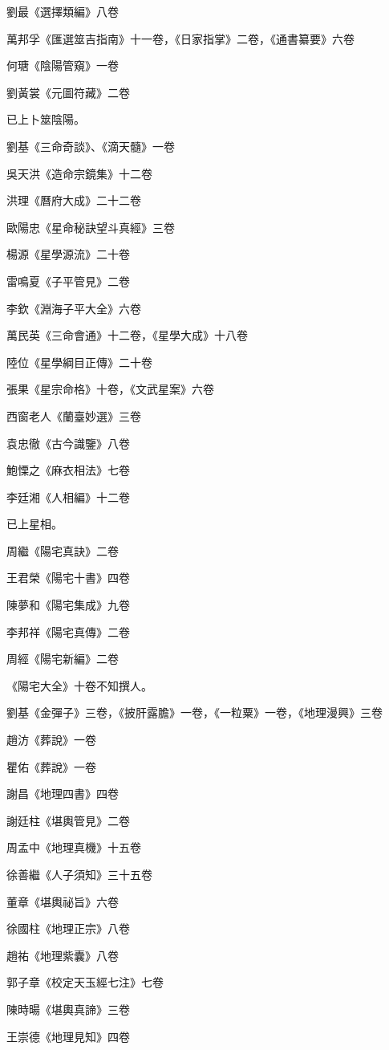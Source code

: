 劉最《選擇類編》八卷

萬邦孚《匯選筮吉指南》十一卷，《日家指掌》二卷，《通書纂要》六卷

何瑭《陰陽管窺》一卷

劉黃裳《元圖符藏》二卷

已上卜筮陰陽。

劉基《三命奇談》、《滴天髓》一卷

吳天洪《造命宗鏡集》十二卷

洪理《曆府大成》二十二卷

歐陽忠《星命秘訣望斗真經》三卷

楊源《星學源流》二十卷

雷鳴夏《子平管見》二卷

李欽《淵海子平大全》六卷

萬民英《三命會通》十二卷，《星學大成》十八卷

陸位《星學綱目正傳》二十卷

張果《星宗命格》十卷，《文武星案》六卷

西窗老人《蘭臺妙選》三卷

袁忠徹《古今識鑒》八卷

鮑慄之《麻衣相法》七卷

李廷湘《人相編》十二卷

已上星相。

周繼《陽宅真訣》二卷

王君榮《陽宅十書》四卷

陳夢和《陽宅集成》九卷

李邦祥《陽宅真傳》二卷

周經《陽宅新編》二卷

《陽宅大全》十卷不知撰人。

劉基《金彈子》三卷，《披肝露膽》一卷，《一粒粟》一卷，《地理漫興》三卷

趙汸《葬說》一卷

瞿佑《葬說》一卷

謝昌《地理四書》四卷

謝廷柱《堪輿管見》二卷

周孟中《地理真機》十五卷

徐善繼《人子須知》三十五卷

董章《堪輿祕旨》六卷

徐國柱《地理正宗》八卷

趙祐《地理紫囊》八卷

郭子章《校定天玉經七注》七卷

陳時暘《堪輿真諦》三卷

王崇德《地理見知》四卷

